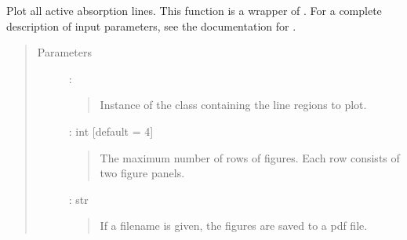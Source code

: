 \documentclass[letterpaper,10pt,english]{sphinxmanual}
\begin{document}
\begin{fulllineitems}
\label{\detokenize{api:output.plot_all_lines}}
Plot all active absorption lines. This function is a wrapper of
{\hyperref[\detokenize{api:output.plot_single_line}]{}}. For a complete description of input parameters,
see the documentation for {\hyperref[\detokenize{api:output.plot_single_line}]{}}.
\begin{quote}\begin{description}
\item[{Parameters}] \leavevmode
{} : {\hyperref[\detokenize{api:VoigtFit.DataSet}]{}}
\begin{quote}

Instance of the {\hyperref[\detokenize{api:VoigtFit.DataSet}]{}} class containing the line
regions to plot.
\end{quote}

 : int   {[}default = 4{]}
\begin{quote}

The maximum number of rows of figures.
Each row consists of two figure panels.
\end{quote}

 : str
\begin{quote}

If a filename is given, the figures are saved to a pdf file.
\end{quote}

\end{description}\end{quote}

\end{fulllineitems}
\end{document}
